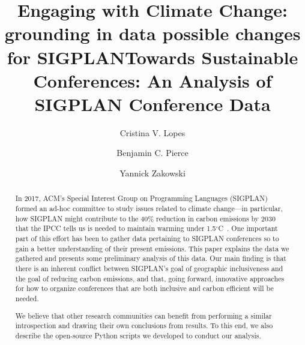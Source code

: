 \documentclass[review, screen]{acmart}
\title{Engaging with Climate Change: grounding in data possible changes for SIGPLAN}
\newif\ifopinions\opinionsfalse   %
\begin{document}
\title{Towards Sustainable Conferences: An Analysis of SIGPLAN Conference Data}

\author{Cristina V. Lopes}

\author{Benjamin C. Pierce}

\author{Yannick Zakowski}

\begin{abstract}

In 2017, ACM's Special Interest Group on Programming Languages (SIGPLAN)
formed an ad-hoc committee to study issues related to climate change---in
particular, how SIGPLAN might contribute to the 40\% reduction in carbon
emissions by 2030 that the IPCC tells us is needed to maintain warming under
1.5$^{\circ}$C~\cite{IPCCReport}. One important part of this effort has been
to gather data pertaining to SIGPLAN conferences so to gain a better
understanding of their present emissions. This paper explains the data we
gathered and presents some preliminary analysis of this data. Our main
finding is that there is an inherent conflict between SIGPLAN's goal of
geographic inclusiveness and the goal of reducing carbon emissions, and
that, going forward, innovative approaches for how to organize conferences
that are both inclusive and carbon efficient will be needed.

We believe that other research communities can benefit from performing a
similar introspection and drawing their own conclusions from results. To
this end, we also describe the open-source Python scripts we developed to
conduct our analysis.

\end{abstract}


\maketitle






\ifopinions\fi




\end{document}

